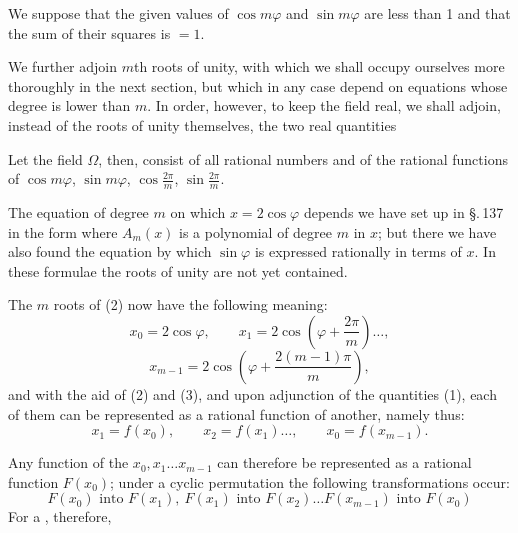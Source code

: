 We suppose that the given values of $\cos m\varphi$ and $\sin m\varphi$ are less than 1 and that the sum of their squares is $= 1$.

We further adjoin $m$th roots of unity, with which we shall occupy ourselves more thoroughly in the next section, but which in any case depend on equations whose degree is lower than $m$. In order, however, to keep the field real, we shall adjoin, instead of the roots of unity themselves, the two real quantities

Let the field $\Omega$, then, consist of all rational numbers and of the rational functions of $\cos m\varphi$, $\sin m\varphi$, $\cos\frac{2\pi}{m}$, $\sin\frac{2\pi}{m}$.

The equation of degree $m$ on which $x = 2\cos\varphi$ depends we have set up in \S.\,137 in the form
where $A_m(x)$ is a polynomial of degree $m$ in $x$; but there we have also found the equation
by which $\sin\varphi$ is expressed rationally in terms of $x$. In these formulae the roots of unity are not yet contained.

The $m$ roots of (2) now have the following meaning:
\[
x_0 = 2\cos\varphi, \qquad x_1 = 2\cos\left(\varphi + \frac{2\pi}{m}\right)\dots,
\]
\[
x_{m-1} = 2\cos\left(\varphi + \frac{2(m-1)\pi}{m}\right),
\]
and with the aid of (2) and (3), and upon adjunction of the quantities (1), each of them can be represented as a rational function of another, namely thus:
\[
x_1 = f(x_0), \qquad x_2 = f(x_1)\dots, \qquad x_0 = f(x_{m-1}).
\]

Any function of the $x_0, x_1 \dots x_{m-1}$ can therefore be represented as a rational function $F(x_0)$; under a cyclic permutation the following transformations occur:
\[
F(x_0) \text{ into } F(x_1), \ F(x_1) \text{ into } F(x_2) \dots F(x_{m-1}) \text{ into } F(x_0)
\]
For a , therefore,

